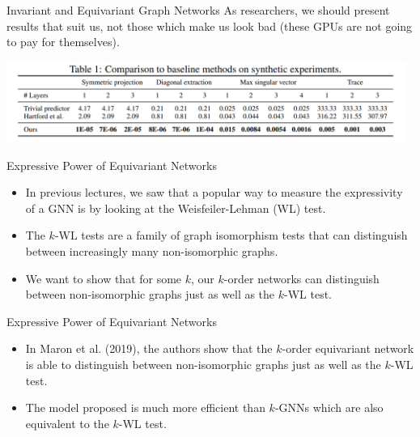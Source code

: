 \documentclass{beamer}
\begin{document}
\begin{frame}{Invariant and Equivariant Graph Networks}
    As researchers, we should present results that suit us, not those which make us look bad (these GPUs are not going to pay for themselves).
    \begin{center}
        \includegraphics[width=0.98\textwidth]{../figures/synth.png}
    \end{center}
\end{frame}
\begin{frame}{Expressive Power of Equivariant Networks}
    \begin{itemize}
        \item In previous lectures, we saw that a popular way to measure the expressivity of a GNN is by looking at the Weisfeiler-Lehman (WL) test.
        \pause
        \item The $k$-WL tests are a family of graph isomorphism tests that can distinguish between increasingly many non-isomorphic graphs.
        \item We want to show that for some $k$, our $k$-order networks can distinguish between non-isomorphic graphs just as well as the $k$-WL test.
    \end{itemize}
\end{frame}
\begin{frame}{Expressive Power of Equivariant Networks}
    \begin{itemize}
        \item In Maron et al. (2019), the authors show that the $k$-order equivariant network is able to distinguish between non-isomorphic graphs just as well as the $k$-WL test.
        \item The model proposed is much more efficient than $k$-GNNs which are also equivalent to the $k$-WL test.
    \end{itemize}
\end{frame}
\end{document}
